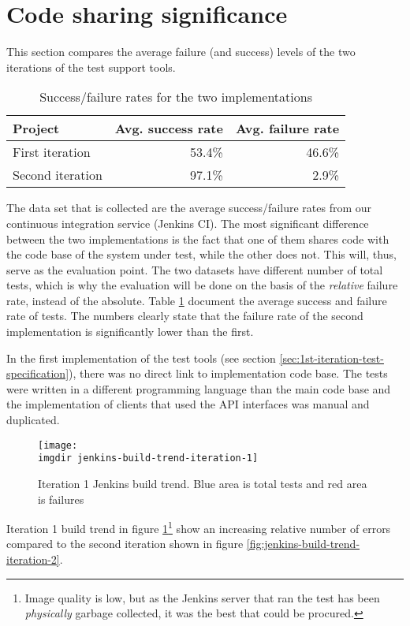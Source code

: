 \section{Code sharing significance}
\label{sec:domain-framework-significance}
This section compares the average failure (and success) levels of the two iterations of the test support tools.\medskip
\begin{table}[!htbp]
\centering
\begin{tabular}{ | l | r | r |}
   \hline
   Project          & Avg. success rate & Avg. failure rate \\ \hline
   First iteration  & 53.4\%            & 46.6\%            \\
   Second iteration & 97.1\%            & 2.9\%             \\
   \hline
\end{tabular}
\caption{Success/failure rates for the two implementations}
\label{tab:jenkins-failure-rates}
\end{table}
\noindent 
The data set that is collected are the average success/failure rates from our continuous integration service (Jenkins CI). The most significant difference between the two implementations is the fact that one of them shares code with the code base of the system under test, while the other does not. This will, thus, serve as the evaluation point. The two datasets have different number of total tests, which is why the evaluation will be done on the basis of the \emph{relative} failure rate, instead of the absolute. Table \ref{tab:jenkins-failure-rates} document the average success and failure rate of tests. The numbers clearly state that the failure rate of the second implementation is significantly lower than the first. \medskip

\noindent In the first implementation of the test tools (see section \ref{sec:1st-iteration-test-specification}), there was no direct link to implementation code base. The tests were written in a different programming language than the main code base and the implementation of clients that used the API interfaces was manual and duplicated.\medskip
\begin{figure}[!hbpt]
\centering
\texttt{[image: \\imgdir jenkins-build-trend-iteration-1]}
\caption{Iteration 1 Jenkins build trend. Blue area is total tests and red area is failures}
\label{fig:jenkins-build-trend-iteration-1}
\end{figure}

\noindent Iteration 1 build trend in figure \ref{fig:jenkins-build-trend-iteration-1}\footnote{Image quality is low, but as the Jenkins server that ran the test has been \emph{physically} garbage collected, it was the best that could be procured.} show an increasing relative number of errors compared to the second iteration shown in figure \ref{fig:jenkins-build-trend-iteration-2}.\medskip

